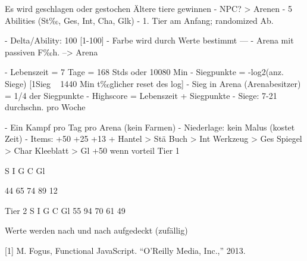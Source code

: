 Es wird geschlagen oder gestochen
Ältere tiere gewinnen
- NPC? > Arenen
- 5 Abilities (St‰, Ges, Int, Cha, Glk)
- 1. Tier am Anfang; randomized Ab.

- Delta/Ability: 100 [1-100]
- Farbe wird durch Werte bestimmt
---
- Arena mit passiven F‰h. --> Arena

- Lebenszeit = 7 Tage = 168 Stds oder 10080 Min
- Siegpunkte = -log2(anz. Siege) [1Sieg ~ 1440 Min t‰glicher reset des log]
- Sieg in Arena (Arenabesitzer) = 1/4 der Siegpunkte
- Highscore = Lebenszeit + Siegpunkte
- Siege: 7-21 durchschn. pro Woche

- Ein Kampf pro Tag pro Arena (kein Farmen)
- Niederlage: kein Malus (kostet Zeit)
- Items: +50 +25 +13 +
	Hantel > Stä
	Buch > Int
	Werkzeug > Ges
	Spiegel > Char
	Kleeblatt > Gl
+50 wenn vorteil
Tier 1 

	S 	I 	G 	C 	Gl

	44	65	74	89	12

Tier 2
	S 	I 	G 	C 	Gl
	55	94	70	61	49


Werte werden nach und nach aufgedeckt (zufällig)



[1]	M. Fogus, Functional JavaScript. “O'Reilly Media, Inc.,” 2013.
